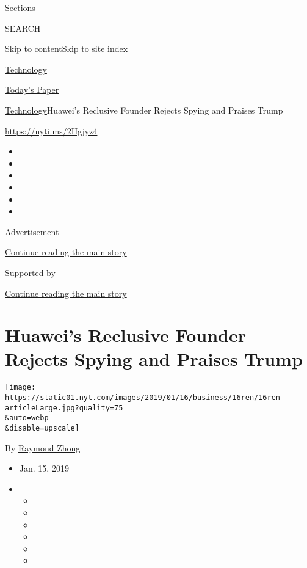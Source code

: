Sections

SEARCH

\protect\hyperlink{site-content}{Skip to
content}\protect\hyperlink{site-index}{Skip to site index}

\href{https://www.nytimes.com/section/technology}{Technology}

\href{https://myaccount.nytimes.com/auth/login?response_type=cookie\&client_id=vi}{}

\href{https://www.nytimes.com/section/todayspaper}{Today's Paper}

\href{/section/technology}{Technology}\textbar{}Huawei's Reclusive
Founder Rejects Spying and Praises Trump

\url{https://nyti.ms/2Hgjyz4}

\begin{itemize}
\item
\item
\item
\item
\item
\item
\end{itemize}

Advertisement

\protect\hyperlink{after-top}{Continue reading the main story}

Supported by

\protect\hyperlink{after-sponsor}{Continue reading the main story}

\hypertarget{huaweis-reclusive-founder-rejects-spying-and-praises-trump}{%
\section{Huawei's Reclusive Founder Rejects Spying and Praises
Trump}\label{huaweis-reclusive-founder-rejects-spying-and-praises-trump}}

\texttt{[image: https://static01.nyt.com/images/2019/01/16/business/16ren/16ren-articleLarge.jpg?quality=75\\\&auto=webp\\\&disable=upscale]}

By \href{https://www.nytimes.com/by/raymond-zhong}{Raymond Zhong}

\begin{itemize}
\item
  Jan. 15, 2019
\item
  \begin{itemize}
  \item
  \item
  \item
  \item
  \item
  \item
  \end{itemize}
\end{itemize}

